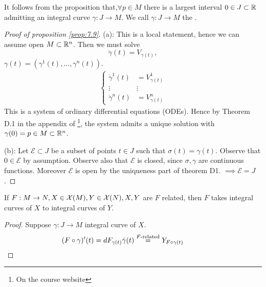 \begin{remark}
    It follows from the proposition that,\(\forall p\in M\) there is a largest interval \(0\in J\subset\mathbb{R}\) admitting an integral curve \(\gamma:J\to M\).
    We call \(\gamma : J\to M\) the .
\end{remark}

\begin{proof}[Proof of proposition \ref{prop:7.9}]
    (a): This is a local statement, hence we can assume open \(M\subset\mathbb{R}^n\). Then we must solve 
    \[\dot{\gamma}(t)=V_{\gamma(t)},\]
    \(\gamma(t)=(\gamma^1(t),\dots,\gamma^n(t))\).
    \begin{align*}
        \begin{cases}
            \dot{\gamma}^1(t)&=V^1_{\gamma(t)}\\
            \vdots & \vdots \\
            \dot{\gamma}^n(t)&=V^n_{\gamma(t)}
        \end{cases}
    \end{align*}
    This is a system of ordinary differential equations (ODEs). Hence by Theorem D.1 in the appendix of \cite{smooth_manifolds}\footnote{On the course website}, 
    the system admits a unique solution with \(\gamma(0)=p\in M \subset \mathbb{R}^n\). 

    (b): Let \(\mathcal{E}\subset J\) be a subset of points \(t\in J\) such that \(\sigma(t)=\gamma(t)\).
    Observe that \(0\in\mathcal{E}\) by assumption. Observe also that \(\mathcal{E}\) is closed, since \(\sigma,\gamma\) are continuous functions.
    Moreover \(\mathcal{E}\) is open by the uniqueness part of theorem D1. \(\implies \mathcal{E}=J\).\qedhere

\end{proof}

\begin{lemma}\label{lem:7.10}
    If \(F:M\to N,X\in \mathcal{X}(M),Y\in \mathcal{X}(N),X,Y\) are \(F\) related, then \(F\) takes 
    integral curves of \(X\) to integral curves of \(Y\).
\end{lemma}

\begin{proof}
    Suppose \(\gamma:J\to M\) integral curve of \(X\). 
    \begin{align*}
        (F\circ \gamma)'(t)=dF_{\gamma(t)}\dot\gamma(t)\stackrel{F\text{-related}}{=}Y_{F\circ \gamma(t)}\hspace{1cm}\qedhere
    \end{align*}
\end{proof}


